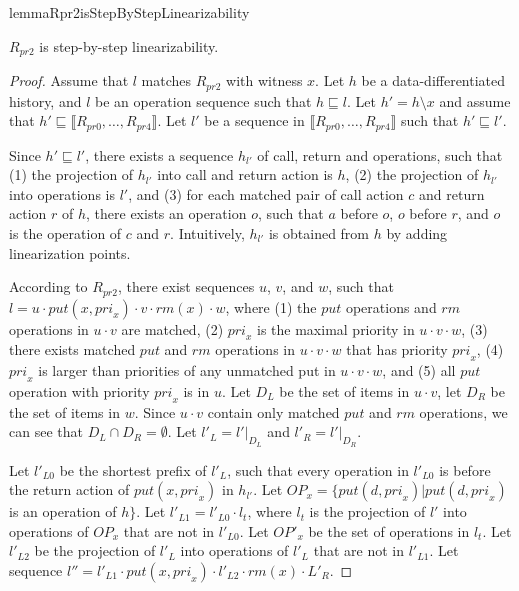 \begin{restatable}{lemma}{Rpr2isStepByStepLinearizability}
\label{lemma:Rpr2 is step-by-step linearizability}

$R_{\textit{pr2}}$ is step-by-step linearizability.

\end{restatable}

\begin {proof}

Assume that $l$ matches $R_{\textit{pr2}}$ with witness $x$. Let $h$ be a data-differentiated history, and $l$ be an operation sequence such that $h \sqsubseteq l$. Let $h'=h \setminus x$ and assume that $h' \sqsubseteq \llbracket R_{\textit{pr0}},\ldots,R_{\textit{pr4}} \rrbracket$. Let $l'$ be a sequence in $\llbracket R_{\textit{pr0}},\ldots,R_{\textit{pr4}} \rrbracket$ such that $h' \sqsubseteq l'$.

Since $h' \sqsubseteq l'$, there exists a sequence $h_{l'}$ of call, return and operations, such that (1) the projection of $h_{l'}$ into call and return action is $h$, (2) the projection of $h_{l'}$ into operations is $l'$, and (3) for each matched pair of call action $c$ and return action $r$ of $h$, there exists an operation $o$, such that $a$ before $o$, $o$ before $r$, and $o$ is the operation of $c$ and $r$. Intuitively, $h_{l'}$ is obtained from $h$ by adding linearization points.

According to $R_{\textit{pr2}}$, there exist sequences $u$, $v$, and $w$, such that $l=u \cdot \textit{put}(x,\textit{pri}_x) \cdot v \cdot \textit{rm}(x) \cdot w$, where (1) the $\textit{put}$ operations and $\textit{rm}$ operations in $u \cdot v$ are matched, (2) $\textit{pri}_x$ is the maximal priority in $u \cdot v \cdot w$, (3) there exists matched $\textit{put}$ and $\textit{rm}$ operations in $u \cdot v \cdot w$ that has priority $\textit{pri}_x$, (4) $\textit{pri}_x$ is larger than priorities of any unmatched put in $u \cdot v \cdot w$, and (5) all $\textit{put}$ operation with priority $\textit{pri}_x$ is in $u$. Let $D_L$ be the set of items in $u \cdot v$, let $D_R$ be the set of items in $w$. Since $u \cdot v$ contain only matched $\textit{put}$ and $\textit{rm}$ operations, we can see that $D_L \cap D_R = \emptyset$. Let $l'_L = l' \vert_{D_L}$ and $l'_R = l' \vert_{D_R}$.

Let $l'_{\textit{L0}}$ be the shortest prefix of $l'_L$, such that every operation in $l'_{\textit{L0}}$ is before the return action of $\textit{put}(x,\textit{pri}_x)$ in $h_{l'}$. Let $\textit{OP}_x = \{ \textit{put}(d,\textit{pri}_x) \vert \textit{put}(d,\textit{pri}_x)$ is an operation of $h\}$. Let $l'_{\textit{L1}} = l'_{\textit{L0}} \cdot l_t$, where $l_t$ is the projection of $l'$ into operations of $\textit{OP}_x$ that are not in $l'_{\textit{L0}}$. Let $\textit{OP}'_x$ be the set of operations in $l_t$. Let $l'_{\textit{L2}}$ be the projection of $l'_L$ into operations of $l'_L$ that are not in $l'_{\textit{L1}}$. Let sequence $l'' = l'_{L1} \cdot \textit{put}(x,\textit{pri}_x) \cdot l'_{L2} \cdot \textit{rm}(x) \cdot L'_R$.


\end{proof}
